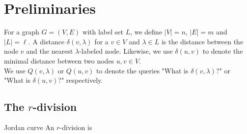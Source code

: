 \section{Preliminaries}
\label{sec:preliminaries}
For a graph $G=(V,E)$ with label set $L$, we define $|V|=n$, $|E|=m$ and $|L|=\ell$. A
distance $\delta(v,\lambda)$ for a $v\in V$ and $\lambda\in L$ is the distance between
the node $v$ and the nearest $\lambda$-labeled node. Likewise, we use $\delta(u,v)$ to denote
the minimal distance between two nodes $u,v\in V$. \\
We use $Q(v,\lambda)$ or $Q(u,v)$ to denote the queries "What is $\delta(v,\lambda)$?" or
"What is $\delta(u,v)$?" respectively.

\subsection{The $r$-division}
Jordan curve \cite{miller1984finding}
An $r$-division \cite{federickson1987fast} is 

